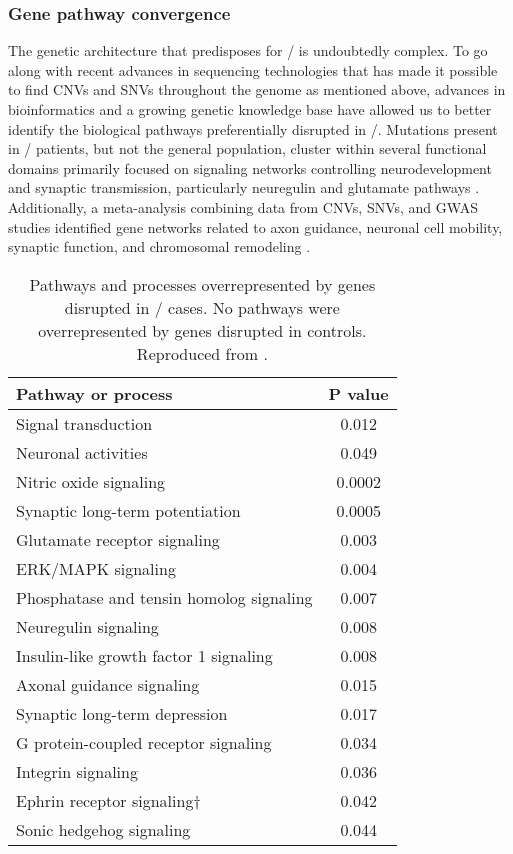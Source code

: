 \subsubsection{Gene pathway convergence}
The genetic architecture that predisposes for \scz/ is undoubtedly complex.
To go along with recent advances in sequencing technologies that has made it possible to find CNVs and SNVs throughout the genome as mentioned above, advances in bioinformatics and a growing genetic knowledge base have allowed us to better identify the biological pathways preferentially disrupted in \scz/.
Mutations present in \scz/ patients, but not the general population, cluster within several functional domains primarily focused on signaling networks controlling neurodevelopment and synaptic transmission, particularly neuregulin and glutamate pathways \citep[\autoref{table:intro:scz:pathways},][]{Walsh2008, Glessner2010}.
Additionally, a meta-analysis combining data from \ac{CNVs}, \ac{SNVs}, and GWAS studies identified gene networks related to axon guidance, neuronal cell mobility, synaptic function, and chromosomal remodeling \citep[\autoref{fig:intro:scz:cluster},][]{Gilman2012}.

\begin{table}
\centering
\begin{tabular}{l c}
\textbf{Pathway or process} & \textbf{P value} \\
\hline
Signal transduction & 0.012 \\
Neuronal activities & 0.049 \\
Nitric oxide signaling & 0.0002 \\
Synaptic long-term potentiation & 0.0005 \\
Glutamate receptor signaling & 0.003 \\
ERK/MAPK signaling & 0.004 \\
Phosphatase and tensin homolog signaling & 0.007 \\
Neuregulin signaling & 0.008 \\
Insulin-like growth factor 1 signaling & 0.008 \\
Axonal guidance signaling & 0.015 \\
Synaptic long-term depression & 0.017 \\
G protein-coupled receptor signaling & 0.034 \\
Integrin signaling & 0.036 \\
Ephrin receptor signaling† & 0.042 \\
Sonic hedgehog signaling & 0.044 \\
\end{tabular}
\caption[Pathways implicated in \scz/]{Pathways and processes overrepresented by genes disrupted in \scz/ cases. No pathways were overrepresented by genes disrupted in controls.
Reproduced from \citet{Walsh2008}.}
\label{table:intro:scz:pathways}
\end{table}

